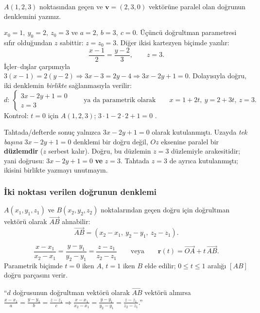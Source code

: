 \begin{soru}
$A(1,2,3)$ noktasından geçen ve $\mathbf v=(2,3,0)$ vektörüne paralel olan doğrunun denklemini yazınız.
\end{soru}
\begin{cevap}
$x_0=1,\ y_0=2,\ z_0=3$ ve $a=2,\ b=3,\ c=0$. Üçüncü doğrultman parametresi sıfır olduğundan $z$ sabittir: $z=z_0=3$. Diğer ikisi kartezyen biçimde yazılır:
\[ \boxed{\frac{x-1}{2}=\frac{y-2}{3},\qquad z=3.} \]
İçler--dışlar çarpımıyla $3(x-1)=2(y-2)\Rightarrow 3x-3=2y-4\Rightarrow 3x-2y+1=0$. Dolayısıyla doğru, iki denklemin \emph{birlikte} sağlanmasıyla verilir:
\[ d:\ \begin{cases}3x-2y+1=0\\ z=3\end{cases}\qquad\text{ya da parametrik olarak}\qquad x=1+2t,\ y=2+3t,\ z=3 . \]
Kontrol: $t=0$ için $A(1,2,3)$; $3\cdot1-2\cdot2+1=0$ \checkmark.
\end{cevap}

\begin{dikkat}
Tahtada/defterde sonuç yalnızca $\boxed{3x-2y+1=0}$ olarak kutulanmıştı. Uzayda \emph{tek başına} $3x-2y+1=0$ denklemi bir doğru değil, $Oz$ eksenine paralel bir \textbf{düzlemdir} ($z$ serbest kalır). Doğru, bu düzlemin $z=3$ düzlemiyle arakesitidir; yani doğrusu: $3x-2y+1=0$ \textbf{ve} $z=3$. Tahtada $z=3$ de ayrıca kutulanmıştı; ikisini birlikte yazmayı unutmayın.
\end{dikkat}

\subsubsection{İki noktası verilen doğrunun denklemi}

$A(x_1,y_1,z_1)$ ve $B(x_2,y_2,z_2)$ noktalarından geçen doğru için doğrultman vektörü olarak $\overrightarrow{AB}$ alınabilir:
\[ \overrightarrow{AB}=(x_2-x_1,\ y_2-y_1,\ z_2-z_1). \]

\begin{teorem}
\[ \frac{x-x_1}{x_2-x_1}=\frac{y-y_1}{y_2-y_1}=\frac{z-z_1}{z_2-z_1}
\qquad\text{veya}\qquad \mathbf r(t)=\overrightarrow{OA}+t\,\overrightarrow{AB}. \]
Parametrik biçimde $t=0$ iken $A$, $t=1$ iken $B$ elde edilir; $0\le t\le1$ aralığı $[AB]$ doğru parçasını verir.
\end{teorem}

\begin{tahta}
``$d$ doğrusunun doğrultman vektörü olarak $\overrightarrow{AB}$ vektörü alınırsa
$\frac{x-x_1}{a}=\frac{y-y_1}{b}=\frac{z-z_1}{c}\Rightarrow \frac{x-x_1}{x_2-x_1}=\frac{y-y_1}{y_2-y_1}=\frac{z-z_1}{z_2-z_1}$.''
\end{tahta}

